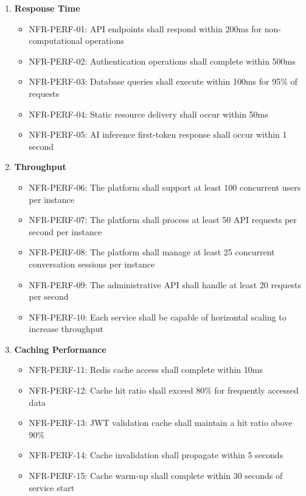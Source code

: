 \begin{enumerate}
   \item \textbf{Response Time}
   \begin{itemize}
      \item NFR-PERF-01: API endpoints shall respond within 200ms for non-computational operations
      \item NFR-PERF-02: Authentication operations shall complete within 500ms
      \item NFR-PERF-03: Database queries shall execute within 100ms for 95\% of requests
      \item NFR-PERF-04: Static resource delivery shall occur within 50ms
      \item NFR-PERF-05: AI inference first-token response shall occur within 1 second
   \end{itemize}

   \item \textbf{Throughput}
   \begin{itemize}
      \item NFR-PERF-06: The platform shall support at least 100 concurrent users per instance
      \item NFR-PERF-07: The platform shall process at least 50 API requests per second per instance
      \item NFR-PERF-08: The platform shall manage at least 25 concurrent conversation sessions per instance
      \item NFR-PERF-09: The administrative API shall handle at least 20 requests per second
      \item NFR-PERF-10: Each service shall be capable of horizontal scaling to increase throughput
   \end{itemize}

   \item \textbf{Caching Performance}
   \begin{itemize}
      \item NFR-PERF-11: Redis cache access shall complete within 10ms
      \item NFR-PERF-12: Cache hit ratio shall exceed 80\% for frequently accessed data
      \item NFR-PERF-13: JWT validation cache shall maintain a hit ratio above 90\%
      \item NFR-PERF-14: Cache invalidation shall propagate within 5 seconds
      \item NFR-PERF-15: Cache warm-up shall complete within 30 seconds of service start
   \end{itemize}


\end{enumerate}
